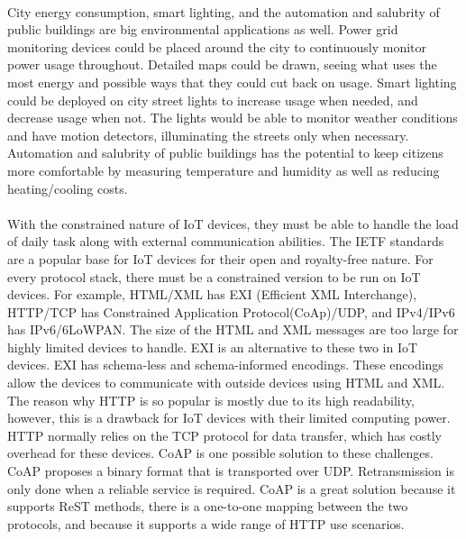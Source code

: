 \documentclass[a4paper,12pt]{article}
\begin{document}
\paragraph{}
City energy consumption, smart lighting, and the automation and salubrity of public buildings are big environmental applications as well. Power grid monitoring devices could be placed around the city to continuously monitor power usage throughout. Detailed maps could be drawn, seeing what uses the most energy and possible ways that they could cut back on usage. Smart lighting could be deployed on city street lights to increase usage when needed, and decrease usage when not. The lights would be able to monitor weather conditions and have motion detectors, illuminating the streets only when necessary. Automation and salubrity of public buildings has the potential to keep citizens more comfortable by measuring temperature and humidity as well as reducing heating/cooling costs.
\paragraph{}
With the constrained nature of IoT devices, they must be able to handle the load of daily task along with external communication abilities. The IETF standards are a popular base for IoT devices for their open and royalty-free nature. For every protocol stack, there must be a constrained version to be run on IoT devices. For example, HTML/XML has EXI (Efficient XML Interchange), HTTP/TCP has Constrained Application Protocol(CoAp)/UDP, and IPv4/IPv6 has IPv6/6LoWPAN. The size of the HTML and XML messages are too large for highly limited devices to handle. EXI is an alternative to these two in IoT devices. EXI has schema-less and schema-informed encodings. These encodings allow the devices to communicate with outside devices using HTML and XML. The reason why HTTP is so popular is mostly due to its high readability, however, this is a drawback for IoT devices with their limited computing power. HTTP normally relies on the TCP protocol for data transfer, which has costly overhead for these devices. CoAP is one possible solution to these challenges. CoAP proposes a binary format that is transported over UDP. Retransmission is only done when a reliable service is required. CoAP is a great solution because it supports ReST methods, there is a one-to-one mapping between the two protocols, and because it supports a wide range of HTTP use scenarios. 
\end{document}
